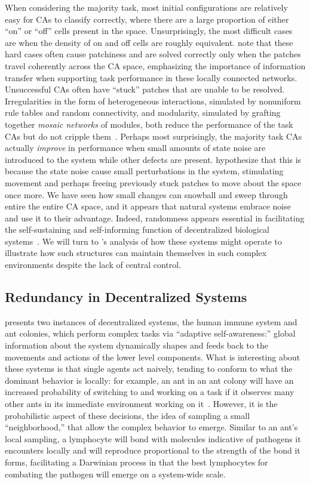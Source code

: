 \documentclass[a4paper,11pt]{report}
\begin{document}
When considering the majority task, most initial configurations are relatively easy for CAs to classify correctly, where there are a large proportion of either ``on'' or ``off'' cells present in the space. Unsurprisingly, the most difficult cases are when the density of on and off cells are roughly equivalent. \citeauthor{me07} note that these hard cases often cause patchiness and are solved correctly only when the patches travel coherently across the CA space, emphasizing the importance of information transfer when supporting task performance in these locally connected networks. Unsuccessful CAs often have ``stuck'' patches that are unable to be resolved. Irregularities in the form of heterogeneous interactions, simulated by nonuniform rule tables and random connectivity, and modularity, simulated by grafting together \textit{mosaic networks} of modules, both reduce the performance of the task CAs but do not cripple them~\cite{me07}. Perhaps most surprisingly, the majority task CAs actually \textit{improve} in performance when small amounts of state noise are introduced to the system while other defects are present. \citeauthor{me07} hypothesize that this is because the state noise cause small perturbations in the system, stimulating movement and perhaps freeing previously stuck patches to move about the space once more. We have seen how small changes can snowball and sweep through entire the entire CA space, and it appears that natural systems embrace noise and use it to their advantage. Indeed, randomness appears essential in facilitating the self-sustaining and self-informing function of decentralized biological systems~\cite{mi05}. We will turn to \citeauthor{mi05}'s analysis of how these systems might operate to illustrate how such structures can maintain themselves in such complex environments despite the lack of central control.


\subsection{Redundancy in Decentralized Systems}
\citeauthor{mi05} presents two instances of decentralized systems, the human immune system and ant colonies, which perform complex tasks via ``adaptive self-awareness:'' global information about the system dynamically shapes and feeds back to the movements and actions of the lower level components. What is interesting about these systems is that single agents act naively, tending to conform to what the dominant behavior is locally: for example, an ant in an ant colony will have an increased probability of switching to and working on a task if it observes many other ants in its immediate environment working on it~\cite{mi05}. However, it is the probabilistic aspect of these decisions, the idea of sampling a small ``neighborhood,'' that allow the complex behavior to emerge. Similar to an ant's local sampling, a lymphocyte will bond with molecules indicative of pathogens it encounters locally and will reproduce proportional to the strength of the bond it forms, facilitating a Darwinian process in that the best lymphocytes for combating the pathogen will emerge on a system-wide scale.
\end{document}
